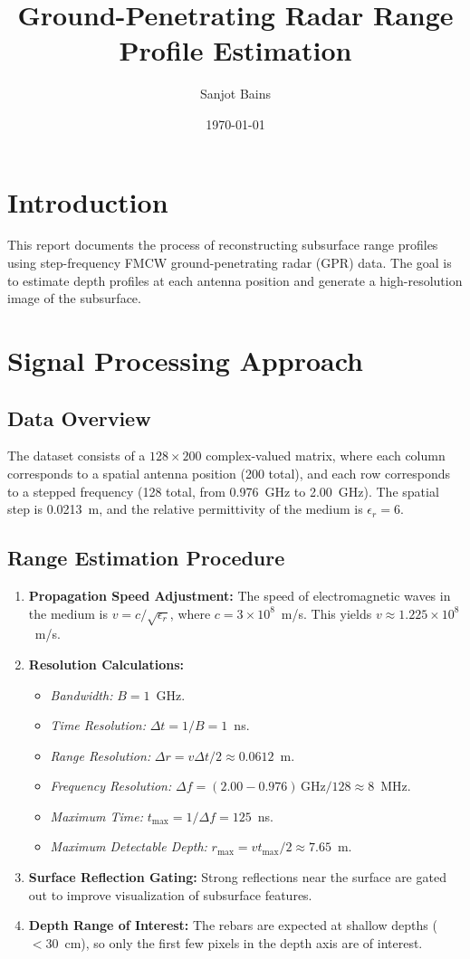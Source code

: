 \documentclass[12pt]{article}
\title{Ground-Penetrating Radar Range Profile Estimation}
\author{Sanjot Bains}
\date{\today}
\begin{document}
\maketitle

\section{Introduction}
This report documents the process of reconstructing subsurface range profiles using step-frequency FMCW ground-penetrating radar (GPR) data. The goal is to estimate depth profiles at each antenna position and generate a high-resolution image of the subsurface.

\section{Signal Processing Approach}
\subsection{Data Overview}
The dataset consists of a $128 \times 200$ complex-valued matrix, where each column corresponds to a spatial antenna position (200 total), and each row corresponds to a stepped frequency (128 total, from 0.976~GHz to 2.00~GHz). The spatial step is 0.0213~m, and the relative permittivity of the medium is $\epsilon_r = 6$.

\subsection{Range Estimation Procedure}
\begin{enumerate}[label=(\alph*)]
    \item \textbf{Propagation Speed Adjustment:} The speed of electromagnetic waves in the medium is $v = c/\sqrt{\epsilon_r}$, where $c = 3 \times 10^8$~m/s. This yields $v \approx 1.225 \times 10^8$~m/s.
    \item \textbf{Resolution Calculations:}
    \begin{itemize}
        \item \textit{Bandwidth:} $B = 1$~GHz.
        \item \textit{Time Resolution:} $\Delta t = 1/B = 1$~ns.
        \item \textit{Range Resolution:} $\Delta r = v \Delta t / 2 \approx 0.0612$~m.
        \item \textit{Frequency Resolution:} $\Delta f = (2.00 - 0.976)\,\text{GHz} / 128 \approx 8$~MHz.
        \item \textit{Maximum Time:} $t_{\text{max}} = 1/\Delta f = 125$~ns.
        \item \textit{Maximum Detectable Depth:} $r_{\text{max}} = v t_{\text{max}} / 2 \approx 7.65$~m.
    \end{itemize}
    \item \textbf{Surface Reflection Gating:} Strong reflections near the surface are gated out to improve visualization of subsurface features.
    \item \textbf{Depth Range of Interest:} The rebars are expected at shallow depths ($< 30$~cm), so only the first few pixels in the depth axis are of interest.
\end{enumerate}
\end{document}
